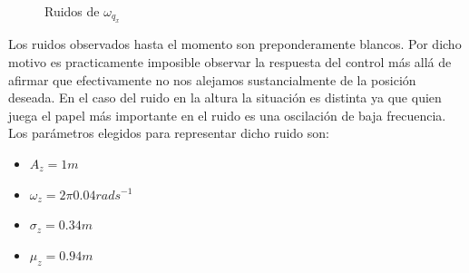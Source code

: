 \documentclass[main]{subfiles}
\begin{document}
\begin{figure}
  \centering
  \caption{Ruidos de $\omega_{q_x}$}
  \label{fig:ruidos_wqx}
\end{figure}


Los ruidos observados hasta el momento son preponderamente blancos. Por dicho motivo es practicamente imposible observar la respuesta del control m\'as all\'a de afirmar que efectivamente no nos alejamos sustancialmente de la posici\'on deseada. En el caso del ruido en la altura la situaci\'on es distinta ya que quien juega el papel m\'as importante en el ruido es una oscilaci\'on de baja frecuencia. Los par\'ametros elegidos para representar dicho ruido son:

\begin{itemize}
\item $A_z = 1 m$
\item $\omega_{z} = 2\pi 0.04 rad s^{-1}$
\item $\sigma_{z} = 0.34 m$
\item $\mu_{z} = 0.94 m$
\end{itemize}
\end{document}
